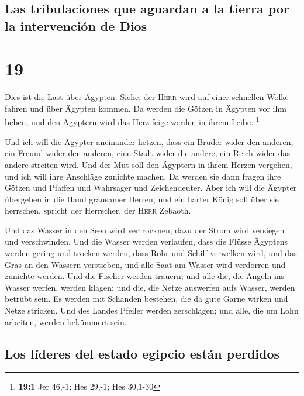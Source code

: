 \hypertarget{las-tribulaciones-que-aguardan-a-la-tierra-por-la-intervenciuxf3n-de-dios}{%
\subsection{Las tribulaciones que aguardan a la tierra por la
intervención de
Dios}\label{las-tribulaciones-que-aguardan-a-la-tierra-por-la-intervenciuxf3n-de-dios}}

\hypertarget{section-18}{%
\section{19}\label{section-18}}

 Dies ist die Last über Ägypten: Siehe, der \textsc{Herr}
wird auf einer schnellen Wolke fahren und über Ägypten kommen. Da werden
die Götzen in Ägypten vor ihm beben, und den Ägyptern wird das Herz
feige werden in ihrem Leibe. \footnote{\textbf{19:1} Jer 46,-1; Hes
  29,-1; Hes 30,1-30}

 Und ich will die Ägypter aneinander hetzen, dass ein
Bruder wider den anderen, ein Freund wider den anderen, eine Stadt wider
die andere, ein Reich wider das andere streiten wird.  Und
der Mut soll den Ägyptern in ihrem Herzen vergehen, und ich will ihre
Anschläge zunichte machen. Da werden sie dann fragen ihre Götzen und
Pfaffen und Wahrsager und Zeichendeuter.  Aber ich will
die Ägypter übergeben in die Hand grausamer Herren, und ein harter König
soll über sie herrschen, spricht der Herrscher, der \textsc{Herr}
Zebaoth.

 Und das Wasser in den Seen wird vertrocknen; dazu der
Strom wird versiegen und verschwinden.  Und die Wasser
werden verlaufen, dass die Flüsse Ägyptens werden gering und trocken
werden, dass Rohr und Schilf verwelken wird,  und das Gras
an den Wassern verstieben, und alle Saat am Wasser wird verdorren und
zunichte werden.  Und die Fischer werden trauern; und alle
die, die Angeln ins Wasser werfen, werden klagen; und die, die Netze
auswerfen aufs Wasser, werden betrübt sein.  Es werden mit
Schanden bestehen, die da gute Garne wirken und Netze stricken.
 Und des Landes Pfeiler werden zerschlagen; und alle, die
um Lohn arbeiten, werden bekümmert sein.

\hypertarget{los-luxedderes-del-estado-egipcio-estuxe1n-perdidos}{%
\subsection{Los líderes del estado egipcio están
perdidos}\label{los-luxedderes-del-estado-egipcio-estuxe1n-perdidos}}

